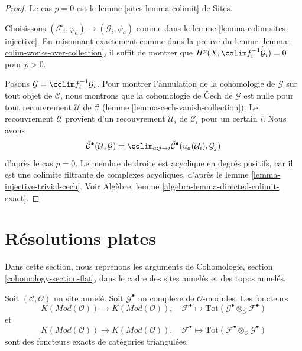 \begin{proof}
Le cas $p = 0$ est le lemme \ref{sites-lemma-colimit} de Sites.

\medskip\noindent
Choisissons $(\mathcal{F}_i, \varphi_a) \to (\mathcal{G}_i, \psi_a)$
comme dans le lemme \ref{lemma-colim-sites-injective}.
En raisonnant exactement comme dans la preuve du
lemme \ref{lemma-colim-works-over-collection}, il suffit de montrer que
$H^p(X, \colim f_i^{-1}\mathcal{G}_i) = 0$ pour $p > 0$.

\medskip\noindent
Posons $\mathcal{G} = \colim f_i^{-1}\mathcal{G}_i$.
Pour montrer l'annulation de la cohomologie de $\mathcal{G}$ sur tout objet de
$\mathcal{C}$, nous montrons que la cohomologie de {\v C}ech de $\mathcal{G}$
est nulle pour tout recouvrement $\mathcal{U}$ de $\mathcal{C}$
(lemme \ref{lemma-cech-vanish-collection}).
Le recouvrement $\mathcal{U}$ provient d'un recouvrement
$\mathcal{U}_i$ de $\mathcal{C}_i$ pour un certain $i$. Nous avons
$$
\check{\mathcal{C}}^\bullet(\mathcal{U}, \mathcal{G}) =
\colim_{a : j \to i}
\check{\mathcal{C}}^\bullet(u_a(\mathcal{U}_i), \mathcal{G}_j)
$$
d'après le cas $p = 0$. Le membre de droite est acyclique en degrés positifs,
car il est une colimite filtrante de complexes acycliques, d'après le
lemme \ref{lemma-injective-trivial-cech}. Voir Algèbre,
lemme \ref{algebra-lemma-directed-colimit-exact}.
\end{proof}















\section{Résolutions plates}
\label{section-flat}

\noindent
Dans cette section, nous reprenons les arguments de Cohomologie,
section \ref{cohomology-section-flat}, dans le cadre des sites annelés et des
topos annelés.

\begin{lemma}
\label{lemma-derived-tor-exact}
Soit $(\mathcal{C}, \mathcal{O})$ un site annelé.
Soit $\mathcal{G}^\bullet$ un complexe de $\mathcal{O}$-modules.
Les foncteurs
$$
K(\textit{Mod}(\mathcal{O}))
\longrightarrow
K(\textit{Mod}(\mathcal{O})),
\quad
\mathcal{F}^\bullet \longmapsto
\text{Tot}(\mathcal{G}^\bullet \otimes_\mathcal{O} \mathcal{F}^\bullet)
$$
et
$$
K(\textit{Mod}(\mathcal{O}))
\longrightarrow
K(\textit{Mod}(\mathcal{O})),
\quad
\mathcal{F}^\bullet \longmapsto
\text{Tot}(\mathcal{F}^\bullet \otimes_\mathcal{O} \mathcal{G}^\bullet)
$$
sont des foncteurs exacts de catégories triangulées.
\end{lemma}

